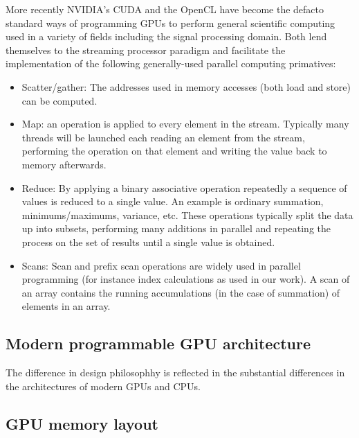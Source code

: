 More recently NVIDIA's CUDA \cite{cuda} and the OpenCL \cite{opencl} have become the defacto standard ways of 
programming GPUs to perform general scientific computing used in a variety of fields including the signal 
processing domain. Both lend themselves to the streaming processor paradigm and facilitate the implementation
of the following generally-used parallel computing primatives:
\begin{itemize}
 \item Scatter/gather: The addresses used in memory accesses (both load and store) can be computed.
 \item Map: an operation is applied to every element in the stream. Typically many threads will be launched
       each reading an element from the stream, performing the operation on that element and writing the value
       back to memory afterwards.
 \item Reduce: By applying a binary associative operation repeatedly a sequence of values is reduced to a single value.
       An example is ordinary summation, minimums/maximums, variance, etc. These operations typically split the data up into
       subsets, performing many additions in parallel and repeating the process on the set of results until a single value is
       obtained. 
 \item Scans: Scan and prefix scan operations are widely used in parallel programming (for instance index calculations as used
       in our work). A scan of an array contains the running accumulations (in the case of summation) of elements in an array. 
\end{itemize}

\subsection{Modern programmable GPU architecture}
The difference in design philosophhy is reflected in the substantial differences in the architectures of modern GPUs and CPUs. 
\subsection{GPU memory layout}